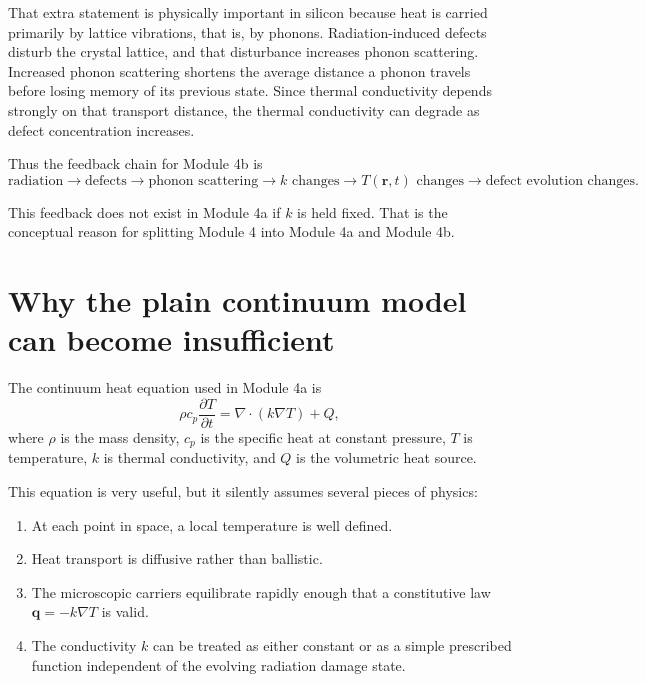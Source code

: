 \documentclass[11pt]{article}
\newcommand{\qvec}{\mathbf{q}}
\newcommand{\rvec}{\mathbf{r}}
\begin{document}
That extra statement is physically important in silicon because heat is carried primarily by lattice vibrations, that is, by phonons. Radiation-induced defects disturb the crystal lattice, and that disturbance increases phonon scattering. Increased phonon scattering shortens the average distance a phonon travels before losing memory of its previous state. Since thermal conductivity depends strongly on that transport distance, the thermal conductivity can degrade as defect concentration increases.

Thus the feedback chain for Module 4b is
\begin{equation}
\text{radiation} \rightarrow \text{defects} \rightarrow \text{phonon scattering} \rightarrow k \text{ changes} \rightarrow T(\rvec,t) \text{ changes} \rightarrow \text{defect evolution changes.}
\end{equation}

This feedback does not exist in Module 4a if $k$ is held fixed. That is the conceptual reason for splitting Module 4 into Module 4a and Module 4b.

\section{Why the plain continuum model can become insufficient}

The continuum heat equation used in Module 4a is
\begin{equation}
\rho c_p \frac{\partial T}{\partial t} = \nabla\cdot\left(k\nabla T\right) + Q,
\end{equation}
where $\rho$ is the mass density, $c_p$ is the specific heat at constant pressure, $T$ is temperature, $k$ is thermal conductivity, and $Q$ is the volumetric heat source.

This equation is very useful, but it silently assumes several pieces of physics:
\begin{enumerate}[label=\arabic*.]
    \item At each point in space, a local temperature is well defined.
    \item Heat transport is diffusive rather than ballistic.
    \item The microscopic carriers equilibrate rapidly enough that a constitutive law $\qvec=-k\nabla T$ is valid.
    \item The conductivity $k$ can be treated as either constant or as a simple prescribed function independent of the evolving radiation damage state.
\end{enumerate}
\end{document}

